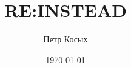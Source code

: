 
\usepackage{indentfirst}
\setmainlanguage{russian}
\title{RE:INSTEAD}
\author{Петр Косых}
\date{\today}
\sloppy




